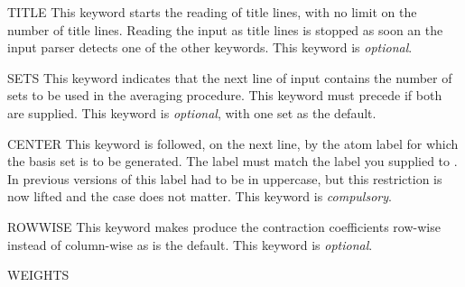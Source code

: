 \begin{keywordlist}
\item[TITLE]
This keyword starts the reading of title lines,
with no limit on the number of title lines.
Reading the input as title lines is stopped as soon
an the input parser detects one of the other keywords.
This keyword is {\it optional}.
\item[SETS]
This keyword indicates that the next line of input
contains the number of sets to be used in the
averaging procedure.
This keyword must precede  if
both are supplied.
This keyword is {\it optional}, with one set as the default.
\item[CENTER]
This keyword is followed, on the next line, by the atom
label for which the basis set is to be generated.
The label must match the label you supplied to
.
In previous versions of  this label had to
be in uppercase, but this restriction is now lifted and
the case does not matter.
This keyword is {\it compulsory}.
\item[ROWWISE]
This keyword makes  produce the
contraction coefficients row-wise instead of
column-wise as is the default.
This keyword is {\it optional}.
\item[WEIGHTS]

\end{keywordlist}

